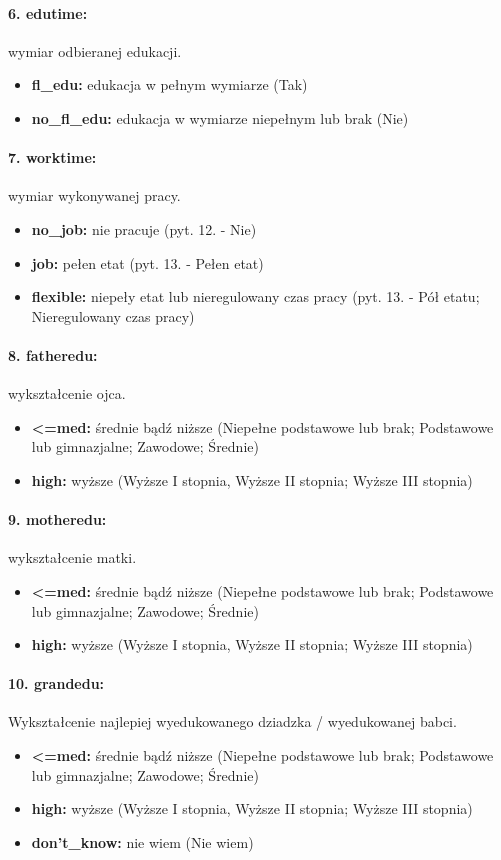 \documentclass[10pt, a4paper]{article}
\begin{document}
\paragraph{6. edutime:} wymiar odbieranej edukacji.
\begin{itemize}
	\item {\bf fl\_edu:} edukacja w pełnym wymiarze (Tak)
	\item {\bf no\_fl\_edu:} edukacja w wymiarze niepełnym lub brak (Nie)
\end{itemize}
\paragraph{7. worktime:} wymiar wykonywanej pracy.
\begin{itemize}
	\item {\bf no\_job:} nie pracuje (pyt. 12. - Nie)
	\item {\bf job:} pełen etat (pyt. 13. - Pełen etat)
	\item {\bf flexible:} niepeły etat lub nieregulowany czas pracy (pyt. 13. - Pół etatu; Nieregulowany czas pracy)
\end{itemize}
\paragraph{8. fatheredu:} wykształcenie ojca.
\begin{itemize}
	\item {\bf <=med:} średnie bądź niższe (Niepełne podstawowe lub brak; Podstawowe lub gimnazjalne; Zawodowe; Średnie)
	\item {\bf high:} wyższe (Wyższe I stopnia, Wyższe II stopnia; Wyższe III stopnia)
\end{itemize}
\paragraph{9. motheredu:} wykształcenie matki.
\begin{itemize}
	\item {\bf <=med:} średnie bądź niższe (Niepełne podstawowe lub brak; Podstawowe lub gimnazjalne; Zawodowe; Średnie)
	\item {\bf high:} wyższe (Wyższe I stopnia, Wyższe II stopnia; Wyższe III stopnia)
\end{itemize}
\paragraph{10. grandedu:} Wykształcenie najlepiej wyedukowanego dziadzka / wyedukowanej babci.
\begin{itemize}
	\item {\bf <=med:} średnie bądź niższe (Niepełne podstawowe lub brak; Podstawowe lub gimnazjalne; Zawodowe; Średnie)
	\item {\bf high:} wyższe (Wyższe I stopnia, Wyższe II stopnia; Wyższe III stopnia)
	\item {\bf don't\_know:} nie wiem (Nie wiem)
\end{itemize}
\end{document}
